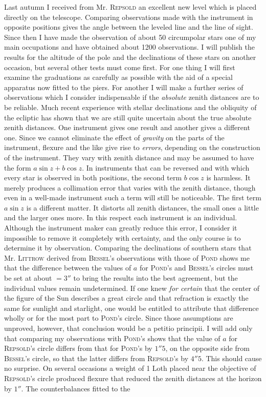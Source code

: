 \par\indent Last autumn I received from Mr. \textsc{Repsold} an excellent new level which is placed directly on the telescope. Comparing observations made with the instrument in opposite positions gives the angle between the leveled line and the line of sight. Since then I have made the observation of about 50 circumpolar stars one of my main occupations and have obtained about 1200 observations. I will publish the results for the altitude of the pole and the declinations of these stars on another occasion, but several other tests must come first. For one thing I will first examine the graduations as carefully as possible with the aid of a special apparatus now fitted to the piers. For another I will make a further series of observations which I consider indispensable if the \emph{absolute} zenith distances are to be reliable. Much recent experience with stellar declinations and the obliquity of the ecliptic has shown that we are still quite uncertain about the true absolute zenith distances. One instrument gives one result and another gives a different one. Since we cannot eliminate the effect of \emph{gravity} on the parts of the instrument, flexure and the like give rise to \emph{errors}, depending on the construction of the instrument. They vary with zenith distance and may be assumed to have the form $a\sin z+b\cos z$. In instruments that can be reversed and with which every star is observed in both positions, the second term $b\cos z$ is harmless. It merely produces a collimation error that varies with the zenith distance, though even in a well-made instrument such a term will still be noticeable. The first term $a\sin z$ is a different matter. It distorts all zenith distances, the small ones a little and the larger ones more. In this respect each instrument is an individual. Although the instrument maker can greatly reduce this error, I consider it impossible to remove it completely with certainty, and the only course is to determine it by observation. Comparing the declinations of southern stars that Mr. \textsc{Littrow} derived from \textsc{Bessel}’s observations with those of \textsc{Pond} shows me that the difference between the values of $a$ for \textsc{Pond}’s and \textsc{Bessel}’s circles must be set at about $=3''$ to bring the results into the best agreement, but the individual values remain undetermined. If one knew \emph{for certain} that the center of the figure of the Sun describes a great circle and that refraction is exactly the same for sunlight and starlight, one would be entitled to attribute that difference wholly or for the most part to \textsc{Pond}’s circle. Since those assumptions are unproved, however, that conclusion would be a petitio principii. I will add only that comparing my observations with \textsc{Pond}’s shows that the value of $a$ for \textsc{Repsold}’s circle differs from that for \textsc{Pond}’s by $1''5$, on the opposite side from \textsc{Bessel}’s circle, so that the latter differs from \textsc{Repsold}’s by $4''5$. This should cause no surprise. On several occasions a weight of 1 Loth placed near the objective of \textsc{Repsold}’s circle produced flexure that reduced the zenith distances at the horizon by $1''$. The counterbalances fitted to the 